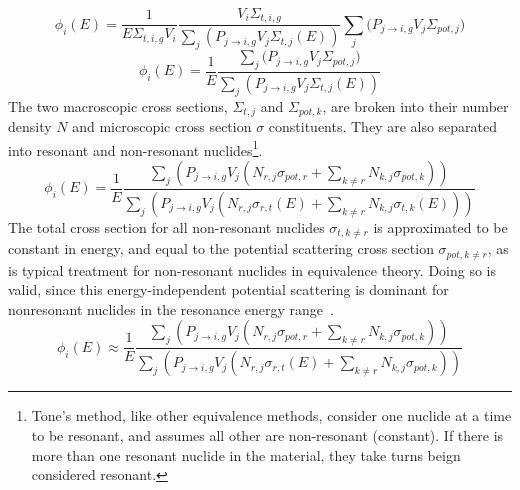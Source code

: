 \documentclass[10pt]{article}
\begin{document}
\begin{equation}\phi_{i}(E)=\frac{1}{E\Sigma_{t,i,g}V_i}\frac{V_i\Sigma_{t,i,g}}{\sum\limits_{j}\left(P_{j\rightarrow i,g}V_{j}\Sigma_{t,j}(E)\right)}\sum\limits_j\Big(P_{j\rightarrow i,g}V_{j}\Sigma_{pot,j}\Big)\end{equation}
\begin{equation}\phi_{i}(E)=\frac{1}{E}\frac{\sum\limits_j\Big(P_{j\rightarrow i,g}V_{j}\Sigma_{pot,j}\Big)}{\sum\limits_{j}\left(P_{j\rightarrow i,g}V_{j}\Sigma_{t,j}(E)\right)}\end{equation}
  The two macroscopic cross sections, $\Sigma_{t,j}$ and $\Sigma_{pot,k}$, are broken into their number density $N$ and microscopic cross section $\sigma$ constituents. They are also separated into resonant and non-resonant nuclides\footnote{Tone's method, like other equivalence methods, consider one nuclide at a time to be resonant, and assumes all other are non-resonant (constant). If there is more than one resonant nuclide in the material, they take turns beign considered resonant.}. 
\begin{equation}\phi_{i}(E)=\frac{1}{E}\frac{\sum\limits_j\left(P_{j\rightarrow i,g}V_{j}\left(N_{r,j}\sigma_{pot,r}+\sum\limits_{k\neq r}N_{k,j}\sigma_{pot,k}\right)\right)}{\sum\limits_{j}\left(P_{j\rightarrow i,g}V_{j}\left(N_{r,j}\sigma_{r,t}(E)+\sum\limits_{k\neq r}N_{k,j}\sigma_{t,k}(E)\right)\right)}\end{equation}
  The total cross section for all non-resonant nuclides $\sigma_{t,k\neq r}$ is approximated to be constant in energy, and equal to the potential scattering cross section $\sigma_{pot,k\neq r}$, as is typical treatment for non-resonant nuclides in equivalence theory. Doing so is valid, since this energy-independent potential scattering is dominant for nonresonant nuclides in the resonance energy range~\cite{ch9}.
\begin{equation}\phi_{i}(E)\approx\frac{1}{E}\frac{\sum\limits_j\left(P_{j\rightarrow i,g}V_{j}\left(N_{r,j}\sigma_{pot,r}+\sum\limits_{k\neq r}N_{k,j}\sigma_{pot,k}\right)\right)}{\sum\limits_{j}\left(P_{j\rightarrow i,g}V_{j}\left(N_{r,j}\sigma_{r,t}(E)+\sum\limits_{k\neq r}N_{k,j}\sigma_{pot,k}\right)\right)}\label{eq:almost}\end{equation}
\end{document}
